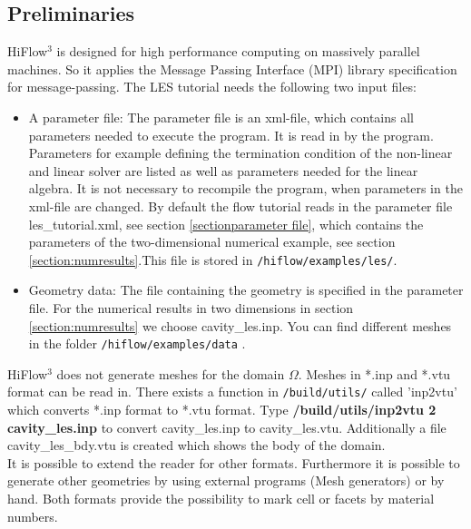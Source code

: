 \documentclass[a4paper, 11pt, twoside]{article}
\begin{document}
\subsection{Preliminaries}
HiFlow$^3$ is designed for high performance computing on massively parallel machines. 
So it applies the Message Passing Interface (MPI) library specification for message-passing. 
The LES tutorial needs the following two input files:
\begin{itemize}
\item A parameter file: The parameter file is an xml-file, which contains all parameters needed to execute the program. It is read in by the program. Parameters for example defining the termination condition of the non-linear and linear solver are listed as well as parameters needed for the linear algebra. It is not necessary to recompile the program, when parameters in the xml-file are changed. By default the flow tutorial reads in the parameter file les\_tutorial.xml, see section \ref{sectionparameter file}, which contains the parameters of the two-dimensional numerical example, see section \ref{section:numresults}.This file is stored in \verb'/hiflow/examples/les/'. 
\item Geometry data: The file containing the geometry is specified in the parameter file. For the numerical results in two dimensions in section \ref{section:numresults} we choose cavity\_les.inp. You can find different meshes in the folder \newline \verb'/hiflow/examples/data' .
\end{itemize}

HiFlow$^3$ does not generate meshes for the domain $\Omega$. Meshes in *.inp and *.vtu format can be read in. There exists a function in \verb'/build/utils/' called 'inp2vtu' which converts *.inp format to *.vtu format. Type \textbf{/build/utils/inp2vtu 2 cavity\_les.inp} to convert cavity\_les.inp to cavity\_les.vtu. Additionally a file cavity\_les\_bdy.vtu is created which shows the body of the domain.\\
It is possible to extend the reader for other formats.
Furthermore it is possible to generate other geometries by using external programs (Mesh generators) or by hand. 
Both formats provide the possibility to mark cell or facets by material numbers.
\end{document}
